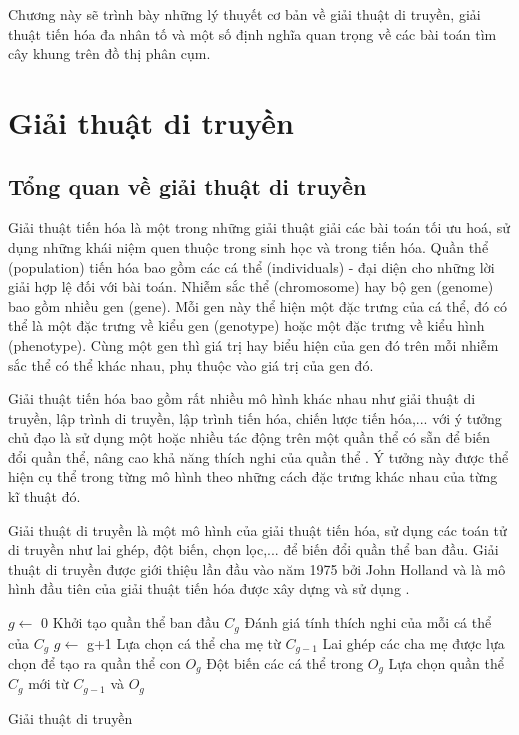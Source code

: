 
Chương này sẽ trình bày những lý thuyết cơ bản về giải thuật di truyền, giải thuật tiến hóa đa nhân tố và một số định nghĩa quan trọng về các bài toán tìm cây khung trên đồ thị phân cụm.

\section{Giải thuật di truyền} \label{chap_coso:sec:ga}
\subsection{Tổng quan về giải thuật di truyền} \label{chap_coso:sec_ga:subsec:tongquan}

Giải thuật tiến hóa là một trong những giải thuật giải các bài toán tối ưu hoá, sử dụng những khái niệm quen thuộc trong sinh học và trong tiến hóa. Quần thể (population) tiến hóa bao gồm các cá thể (individuals) - đại diện cho những lời giải hợp lệ đối với bài toán. Nhiễm sắc thể (chromosome) hay bộ gen (genome) bao gồm nhiều gen (gene). Mỗi gen này thể hiện một đặc trưng của cá thể, đó có thể là một đặc trưng về kiểu gen (genotype) hoặc một đặc trưng về kiểu hình (phenotype). Cùng một gen thì giá trị hay biểu hiện của gen đó trên mỗi nhiễm sắc thể có thể khác nhau, phụ thuộc vào giá trị của gen đó.

Giải thuật tiến hóa bao gồm rất nhiều mô hình khác nhau như giải thuật di truyền, lập trình di truyền, lập trình tiến hóa, chiến lược tiến hóa,... với ý tưởng chủ đạo là sử dụng một hoặc nhiều tác động trên một quần thể có sẵn để biến đổi quần thể, nâng cao khả năng thích nghi của quần thể \cite{agoston_eiben_2003, back_evolutionary_1996}. Ý tưởng này được thể hiện cụ thể trong từng mô hình theo những cách đặc trưng khác nhau của từng kĩ thuật đó.

Giải thuật di truyền là một mô hình của giải thuật tiến hóa, sử dụng các toán tử di truyền như lai ghép, đột biến, chọn lọc,... để biến đổi quần thể ban đầu. Giải thuật di truyền được giới thiệu lần đầu vào năm 1975 bởi John Holland \cite{holland1975adaptation} và là mô hình đầu tiên của giải thuật tiến hóa được xây dựng và sử dụng \cite{agoston_eiben_2003, back_evolutionary_1996}. 

\begin{algorithm}[htb]
	\Begin
	{	
		$g \leftarrow$ 0\;
		Khởi tạo quần thể ban đầu $C_g$\;
		{
			Đánh giá tính thích nghi của mỗi cá thể của $C_g$\;
			$g \leftarrow$ g+1\;
			Lựa chọn cá thể cha mẹ từ $C_{g-1}$\;
			Lai ghép các cha mẹ được lựa chọn để tạo ra quần thể con $O_g$\;
			Đột biến các cá thể trong $O_g$\;
			Lựa chọn quần thể $C_g$ mới từ $C_{g-1}$ và $O_g$\;
		}
	}
	\caption{Giải thuật di truyền}
	\label{alg:Create_random_individual}
\end{algorithm}


